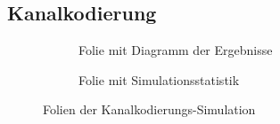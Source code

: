 \subsection{Kanalkodierung}
\label{kapitel:visualisierung_simulation_kanalkodierung}
\begin{figure}[th]
	\centering
	\begin{subfigure}{0.48\textwidth}
		\centering
		\caption{Folie mit Diagramm der Ergebnisse}
		\label{abb:folie_simulation_k1}
	\end{subfigure}
	\quad
	\begin{subfigure}{0.48\textwidth}
		\centering
		\caption{Folie mit Simulationsstatistik}
		\label{abb:folie_simulation_k2}
	\end{subfigure}
	\caption{Folien der Kanalkodierungs-Simulation}
	\label{abb:folie_simulation_k}
\end{figure}
